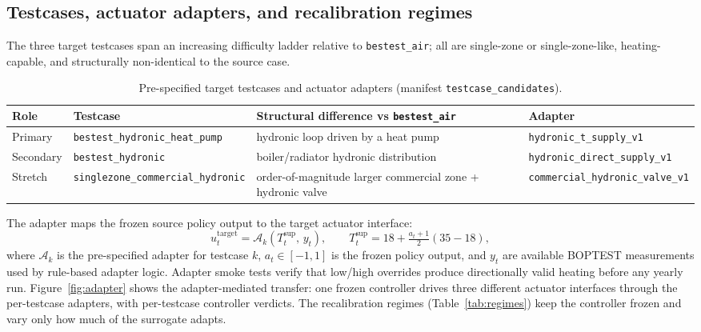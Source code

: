 \documentclass[11pt,a4paper]{article}
\begin{document}
\subsection{Testcases, actuator adapters, and recalibration regimes}

The three target testcases span an increasing difficulty ladder relative to \texttt{bestest\_air}; all are single-zone or single-zone-like, heating-capable, and structurally non-identical to the source case.

\begin{table}[H]
\centering
\small
\caption{Pre-specified target testcases and actuator adapters (manifest \texttt{testcase\_candidates}).}
\label{tab:testcases}
\begin{tabularx}{\linewidth}{l l >{\raggedright\arraybackslash}X l}
\toprule
Role & Testcase & Structural difference vs \texttt{bestest\_air} & Adapter \\
\midrule
Primary & \texttt{bestest\_hydronic\_heat\_pump} & hydronic loop driven by a heat pump & \texttt{hydronic\_t\_supply\_v1} \\
Secondary & \texttt{bestest\_hydronic} & boiler/radiator hydronic distribution & \texttt{hydronic\_direct\_supply\_v1} \\
Stretch & \texttt{singlezone\_commercial\_hydronic} & order-of-magnitude larger commercial zone + hydronic valve & \texttt{commercial\_hydronic\_valve\_v1} \\
\bottomrule
\end{tabularx}
\end{table}

The adapter maps the frozen source policy output to the target actuator interface:
\begin{equation}
  u^{\mathrm{target}}_t = \mathcal{A}_{k}\!\left(T^{\mathrm{sup}}_t,\, y_t\right),
  \qquad
  T^{\mathrm{sup}}_t = 18 + \tfrac{a_t+1}{2}(35-18),
  \label{eq:adapter}
\end{equation}
where $\mathcal{A}_{k}$ is the pre-specified adapter for testcase $k$, $a_t\in[-1,1]$ is the frozen policy output, and $y_t$ are available BOPTEST measurements used by rule-based adapter logic. Adapter smoke tests verify that low/high overrides produce directionally valid heating before any yearly run. Figure~\ref{fig:adapter} shows the adapter-mediated transfer: one frozen controller drives three different actuator interfaces through the per-testcase adapters, with per-testcase controller verdicts. The recalibration regimes (Table~\ref{tab:regimes}) keep the controller frozen and vary only how much of the surrogate adapts.
\end{document}

